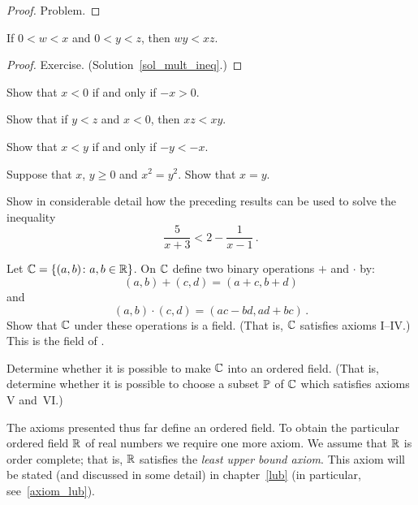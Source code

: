 \begin{proof} Problem.  \ns  \end{proof}

\begin{prop}\label{mult_ineq} If $0 < w < x$ and $0 < y < z$, then $wy < xz$.
\end{prop}

\begin{proof} Exercise. \ns   (Solution~\ref{sol_mult_ineq}.) \end{proof}

\begin{prob} Show that $x < 0$ if and only if $-x > 0$.
\end{prob}

\begin{prob} Show that if $y < z$ and $x < 0$, then $xz < xy$.
\end{prob}

\begin{prob}  Show that $x < y$ if and only if $-y < -x$.
\end{prob}

\begin{prob}\label{prob_sqrt_uniq} Suppose that $x$, $y \ge 0$ and $x^2 = y^2$. Show that $x = y$.
\end{prob}

\begin{prob} Show in considerable detail how the preceding results can be used to solve the
inequality
  \[ \frac5{x + 3} < 2 - \frac1{x - 1}\,. \]
\end{prob}

\begin{prob} Let $\mathbb{C} = \{(a,b) \colon a,b \in \mathbb{R}\}$.  On $\mathbb{C}$ define two binary operations $+$
and $\cdot$ by:
  \[ (a,b) + (c,d) = (a + c, b + d) \]
and
  \[ (a,b) \cdot (c,d) = (ac-bd,ad+bc)\,. \]
Show that $\mathbb{C}$ under these operations is a field. (That is, $\mathbb{C}$ satisfies axioms I--IV.)
This is the field of
.

Determine whether it is possible to make $\mathbb{C}$ into an ordered field.  (That is, determine
whether it is possible to choose a subset $\mathbb{P}$ of $\mathbb{C}$ which satisfies axioms V and~VI.)
\end{prob}

The axioms presented thus far define an ordered field. To obtain the particular ordered field
$\mathbb{R}$ of real numbers we require one more axiom.  We assume that $\mathbb{R}$ is order complete; that
is, $\mathbb{R}$ satisfies the \emph{least upper bound axiom}.  This axiom will be stated (and
discussed in some detail) in chapter~\ref{lub} (in particular, see~\ref{axiom_lub}).


